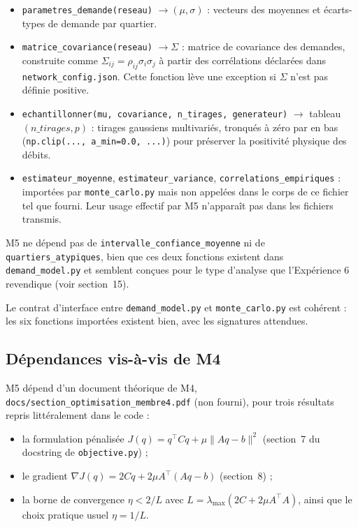\documentclass[11pt,a4paper]{article}
\begin{document}
\begin{itemize}
  \item \texttt{parametres\_demande(reseau)} $\to (\mu, \sigma)$ : vecteurs
  des moyennes et écarts-types de demande par quartier.
  \item \texttt{matrice\_covariance(reseau)} $\to \Sigma$ : matrice de
  covariance des demandes, construite comme $\Sigma_{ij} = \rho_{ij}
  \sigma_i \sigma_j$ à partir des corrélations déclarées dans
  \texttt{network\_config.json}. Cette fonction lève une exception si
  $\Sigma$ n'est pas définie positive.
  \item \texttt{echantillonner(mu, covariance, n\_tirages, generateur)}
  $\to$ tableau $(n\_tirages, p)$ : tirages gaussiens multivariés, tronqués à
  zéro par en bas (\texttt{np.clip(..., a\_min=0.0, ...)}) pour préserver la
  positivité physique des débits.
  \item \texttt{estimateur\_moyenne}, \texttt{estimateur\_variance},
  \texttt{correlations\_empiriques} : importées par \texttt{monte\_carlo.py}
  mais non appelées dans le corps de ce fichier tel que fourni. Leur usage
  effectif par M5 n'apparaît pas dans les fichiers transmis.
\end{itemize}

M5 ne dépend pas de \texttt{intervalle\_confiance\_moyenne} ni de
\texttt{quartiers\_atypiques}, bien que ces deux fonctions existent dans
\texttt{demand\_model.py} et semblent conçues pour le type d'analyse que
l'Expérience 6 revendique (voir section~15).

Le contrat d'interface entre \texttt{demand\_model.py} et
\texttt{monte\_carlo.py} est cohérent : les six fonctions importées existent
bien, avec les signatures attendues.

\subsection{Dépendances vis-à-vis de M4}

M5 dépend d'un document théorique de M4,
\texttt{docs/section\_optimisation\_membre4.pdf} (non fourni), pour trois
résultats repris littéralement dans le code :

\begin{itemize}
  \item la formulation pénalisée $J(q) = q^\top C q + \mu \lVert Aq - b
  \rVert^2$ (section~7 du docstring de \texttt{objective.py}) ;
  \item le gradient $\nabla J(q) = 2Cq + 2\mu A^\top (Aq - b)$ (section~8) ;
  \item la borne de convergence $\eta < 2/L$ avec $L = \lambda_{\max}(2C +
  2\mu A^\top A)$, ainsi que le choix pratique usuel $\eta = 1/L$.
\end{itemize}
\end{document}

